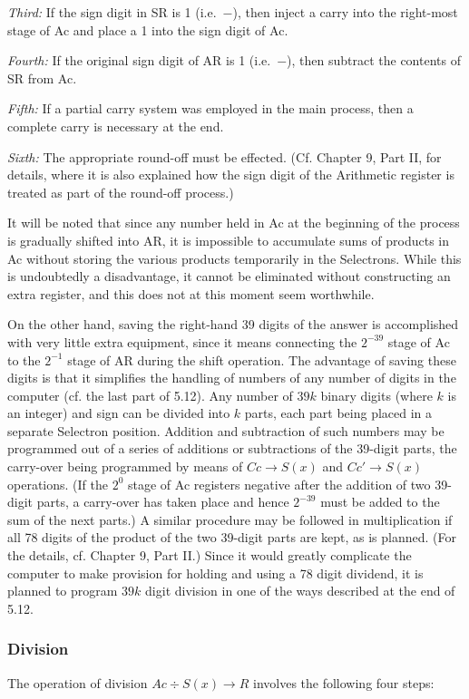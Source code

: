 \documentclass[12pt]{amsart}
\begin{document}
\emph{Third:} If the sign digit in SR is 1 (i.e.\ $-$), then inject a carry into the right-most stage of Ac and place a 1 into the sign digit of Ac.

\emph{Fourth:} If the original sign digit of AR is 1 (i.e.\ $-$), then subtract the contents of SR from Ac.

\emph{Fifth:} If a partial carry system was employed in the main process, then a complete carry is necessary at the end.

\emph{Sixth:} The appropriate round-off must be effected. (Cf. Chapter 9, Part II, for details, where it is also explained how the sign digit of the Arithmetic register is treated as part of the round-off process.)

It will be noted that since any number held in Ac at the beginning of the process is gradually shifted into AR, it is impossible to accumulate sums of products in Ac without storing the various products temporarily in the Selectrons. While this is undoubtedly a disadvantage, it cannot be eliminated without constructing an extra register, and this does not at this moment seem worthwhile.

On the other hand, saving the right-hand 39 digits of the answer is accomplished with very little extra equipment, since it means connecting the $2^{-39}$ stage of Ac to the $2^{-1}$ stage of AR during the shift operation. The advantage of saving these digits is that it simplifies the handling of numbers of any number of digits in the computer (cf. the last part of 5.12). Any number of $39k$ binary digits (where $k$ is an integer) and sign can be divided into $k$ parts, each part being placed in a separate Selectron position. Addition and subtraction of such numbers may be programmed out of a series of additions or subtractions of the 39-digit parts, the carry-over being programmed by means of $Cc \rightarrow S(x)$ and $Cc' \rightarrow S(x)$ operations. (If the $2^0$ stage of Ac registers negative after the addition of two 39-digit parts, a carry-over has taken place and hence $2^{-39}$ must be added to the sum of the next parts.) A similar procedure may be followed in multiplication if all 78 digits of the product of the two 39-digit parts are kept, as is planned. (For the details, cf. Chapter 9, Part II.) Since it would greatly complicate the computer to make provision for holding and using a 78 digit dividend, it is planned to program $39k$ digit division in one of the ways described at the end of 5.12.

\subsubsection{Division}
The operation of division $Ac \div S(x) \rightarrow R$ involves the following four steps:
\end{document}

